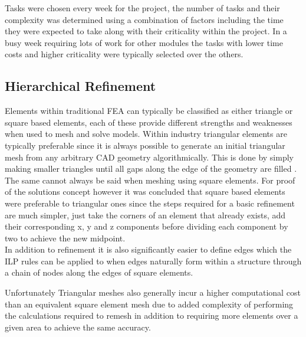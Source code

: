 \noindent
Tasks were chosen every week for the project, the number of tasks and their complexity was determined using a combination of factors including the time they were expected to take along with their criticality within the project. In a busy week requiring lots of work for other modules the tasks with lower time costs and higher criticality were typically selected over the others.

\subsection{Hierarchical Refinement}
\noindent
Elements within traditional FEA can typically be classified as either triangle or square based elements, each of these provide different strengths and weaknesses when used                                                                                                                                                                                                                                                                                                                                                                                                                                                                         to mesh and solve models. Within industry triangular elements are typically preferable since it is always possible to generate an initial triangular mesh from any arbitrary CAD geometry algorithmically. This is done by simply making smaller triangles until all gaps along the edge of the geometry are filled \cite{DelaunyTriangles}. The same cannot always be said  when meshing using square elements. For proof of the solutions concept however it was concluded that square based elements were preferable to triangular ones since the steps required for a basic refinement are much simpler, just take the corners of an element that already exists, add their corresponding x, y and z components before dividing each component by two to achieve the new midpoint. \\ 

\noindent
In addition to refinement it is also significantly easier to define edges which the ILP rules can be applied to when edges naturally form within a structure through a chain of nodes along the edges of square elements.


\noindent
Unfortunately Triangular meshes also generally incur a higher computational cost than an equivalent square element mesh due to added complexity of performing the calculations required to remesh in addition to requiring more elements over a given area to achieve the same accuracy. \\

